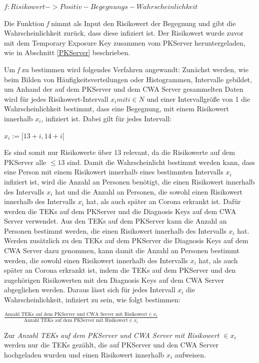 \documentclass[conference,compsoc]{IEEEtran}
\begin{document}
\centerline{\text{ }}
\centerline{$f: Risikowert -> Positiv-Begegnungs-Wahrscheinlichkeit$}
\centerline{\text{ }}

Die Funktion \textit{f} nimmt als Input den Risikowert der Begegnung und gibt die Wahrscheinlichkeit zurück, dass diese infiziert ist.
Der Risikowert wurde zuvor mit dem Temporary Exposure Key zusammen vom PKServer heruntergeladen, wie in Abschnitt \ref{PKServer} beschrieben.

Um \textit{f} zu bestimmen wird folgendes Verfahren angewandt:
Zunächst werden, wie beim Bilden von Häufigkeitsverteilungen oder Histogrammen, Intervalle gebildet, um 
Anhand der auf dem PKServer und dem CWA Server gesammelten Daten wird für jedes Risikowert-Intervall $x_i mit i \in N$ und einer Intervallgröße von 1 die Wahrscheinlichkeit bestimmt, 
dass eine Begegnung, mit einem Risikowert innerhalb $x_i$, infiziert ist. Dabei gilt für jedes Intervall:

\centerline{\text{ }}
\centerline{$x_i := [13+i, 14+i[$}
\centerline{\text{ }}

Es sind somit nur Risikowerte über 13 relevant, da die Risikowerte auf dem PKServer alle $\le 13$ sind. 
Damit die Wahrscheinlicht bestimmt werden kann, dass eine Person mit einem Risikowert innerhalb eines bestimmten Intervalls $x_i$ infiziert ist, 
wird die Anzahl an Personen benötigt, die einen Risikowert innerhalb des Intervalls $x_i$ hat und die Anzahl an Personen, 
die sowohl einen Risikowert innerhalb des Intervalls $x_i$ hat, als auch später an Corona erkrankt ist. 
Dafür werden die TEKs auf dem PKServer und die Diagnosis Keys auf dem CWA Server verwendet. Aus den TEKs auf dem PKServer kann die Anzahl an Personen bestimmt werden,
die einen Risikowert innerhalb des Intervalls $x_i$ hat.
Werden zusätzlich zu den TEKs auf dem PKServer die Diagnosis Keys auf dem CWA Server dazu genommen, 
kann damit die Anzahl an Personen bestimmt werden, die sowohl einen Risikowert innerhalb des Intervalls $x_i$ hat, als auch später an Corona erkrankt ist, 
indem die TEKs auf dem PKServer und den zugehörigen Risikowerten mit den Diagnosis Keys auf dem CWA Server abgeglichen werden. 
Daraus lässt sich für jedes Intervall $x_i$ die Wahrscheinlichkeit, infiziert zu sein, wie folgt bestimmen:

\centerline{\text{ }}
\centerline{$\frac{\text{Anzahl TEKs auf dem PKServer und CWA Server mit Risikowert} \in x_i}{\text{Anzahl TEKs auf dem PKServer mit Risikowert} \in x_i}$}
\centerline{\text{ }}

Zur \textit{Anzahl TEKs auf dem PKServer und CWA Server mit Risikowert $\in x_i$} werden nur die TEKs gezählt, 
die auf PKServer und den CWA Server hochgeladen wurden und einen Risikowert innerhalb $x_i$ aufweisen. 
\end{document}
